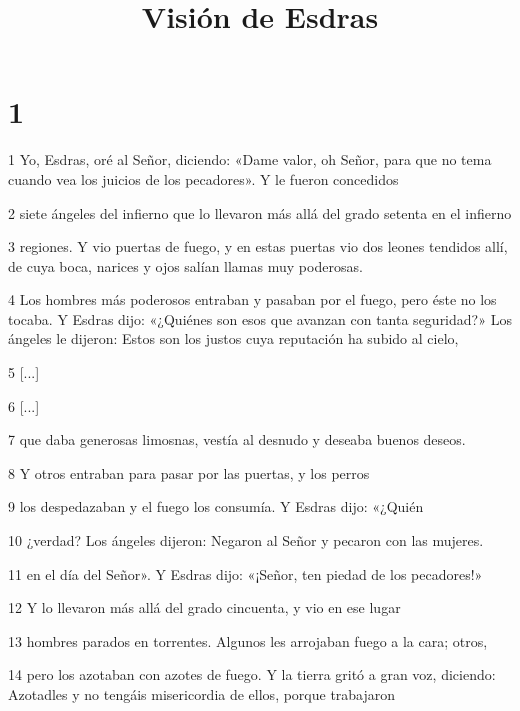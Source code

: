 

\title{Visión de Esdras}

\chapter{1}

\par 1 Yo, Esdras, oré al Señor, diciendo: «Dame valor, oh Señor, para que no tema cuando vea los juicios de los pecadores». Y le fueron concedidos

\par 2 siete ángeles del infierno que lo llevaron más allá del grado setenta en el infierno

\par 3 regiones. Y vio puertas de fuego, y en estas puertas vio dos leones tendidos allí, de cuya boca, narices y ojos salían llamas muy poderosas.

\par 4 Los hombres más poderosos entraban y pasaban por el fuego, pero éste no los tocaba. Y Esdras dijo: «¿Quiénes son esos que avanzan con tanta seguridad?» Los ángeles le dijeron: Estos son los justos cuya reputación ha subido al cielo,

\par 5 [...]

\par 6 [...]

\par 7 que daba generosas limosnas, vestía al desnudo y deseaba buenos deseos.

\par 8 Y otros entraban para pasar por las puertas, y los perros

\par 9 los despedazaban y el fuego los consumía. Y Esdras dijo: «¿Quién

\par 10 ¿verdad? Los ángeles dijeron: Negaron al Señor y pecaron con las mujeres.

\par 11 en el día del Señor». Y Esdras dijo: «¡Señor, ten piedad de los pecadores!»

\par 12 Y lo llevaron más allá del grado cincuenta, y vio en ese lugar

\par 13 hombres parados en torrentes. Algunos les arrojaban fuego a la cara; otros,

\par 14 pero los azotaban con azotes de fuego. Y la tierra gritó a gran voz, diciendo: Azotadles y no tengáis misericordia de ellos, porque trabajaron


